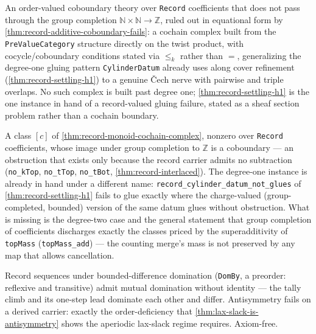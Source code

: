 \begin{theorem}\label{thm:record-monoid-cochain-complex}\notready{}
An order-valued coboundary theory over \texttt{Record} coefficients that does not pass through
the group completion $\mathbb{N}\times\mathbb{N} \to \mathbb{Z}$, ruled out in equational form by
\cref{thm:record-additive-coboundary-fails}: a cochain complex built from the
\texttt{PreValueCategory} structure directly on the twist product, with cocycle/coboundary
conditions stated via \(\le_k\) rather than \(=\), generalizing the degree-one gluing pattern
\texttt{CylinderDatum} already uses along cover refinement (\cref{thm:record-settling-h1}) to a
genuine Čech nerve with pairwise and triple overlaps. No such complex is built past degree one;
\cref{thm:record-settling-h1} is the one instance in hand of a record-valued gluing failure,
stated as a sheaf section problem rather than a cochain boundary.
\end{theorem}

\begin{theorem}\label{thm:irrevocability-class}\notready{}
A class $[c]$ of \cref{thm:record-monoid-cochain-complex}, nonzero over
\texttt{Record} coefficients, whose image under group completion to
$\mathbb{Z}$ is a coboundary --- an obstruction that exists only because the
record carrier admits no subtraction (\texttt{no\_kTop}, \texttt{no\_tTop},
\texttt{no\_tBot}, \cref{thm:record-interlaced}). The degree-one instance is
already in hand under a different name: \texttt{record\_cylinder\_datum\_not\_glues}
of \cref{thm:record-settling-h1} fails to glue exactly where the
charge-valued (group-completed, bounded) version of the same datum glues
without obstruction. What is missing is the degree-two case and the general
statement that group completion of coefficients discharges exactly the
classes priced by the superadditivity of \texttt{topMass}
(\texttt{topMass\_add}) --- the counting merge's mass is not preserved by
any map that allows cancellation.
\end{theorem}

\begin{theorem}\label{thm:germ-order-not-antisymm}\leanok{}
Record sequences under bounded-difference domination (\texttt{DomBy}, a
preorder: reflexive and transitive) admit mutual domination without
identity --- the tally climb and its one-step lead dominate each other and
differ. Antisymmetry fails on a derived carrier: exactly the
order-deficiency that \ref{thm:lax-slack-is-antisymmetry} shows the
aperiodic lax-slack regime requires. Axiom-free.
\end{theorem}

